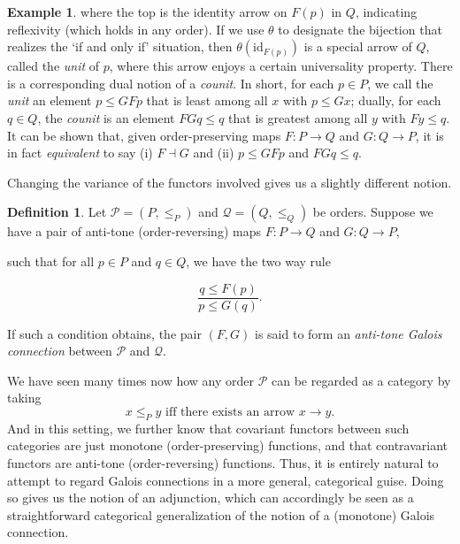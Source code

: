 \documentclass[a4paper]{book}
\theoremstyle{definition}
\newtheorem{example}{Example}[section]
\theoremstyle{definition}
\newtheorem{definition}{Definition}[section]
\theoremstyle{definition}
\theoremstyle{theorem}
\theoremstyle{definition}
\begin{document}
\begin{example}
where the top is the identity arrow on $F(p)$ in $Q$, indicating reflexivity (which holds in any order). If we use $\theta$ to designate the bijection that realizes the `if and only if' situation, then $\theta(\text{id}_{F(p)})$ is a special arrow of $Q$, called the \textit{unit}  of $p$, where this arrow enjoys a certain universality property. There is a corresponding dual notion of a \textit{counit}. In short, for each $p \in P$, we call the \textit{unit} an element $p \leq GFp$ that is least among all $x$ with $p \leq Gx$; dually, for each $q \in Q$, the \textit{counit} is an element $FGq \leq q$ that is greatest among all $y$ with $Fy \leq q$. It can be shown that, given order-preserving maps $F: P \rightarrow Q$ and $G: Q \rightarrow P$, it is in fact \textit{equivalent} to say (i) $F \dashv G$ and (ii) $p \leq GFp$ and $FGq \leq q$.  
\par 
Changing the variance of the functors involved gives us a slightly different notion. 
\begin{definition}
	 Let $\mathcal{P} = (P, \leq_P)$ and $\mathcal{Q} = (Q, \leq_Q)$ be orders. Suppose we have a pair of anti-tone (order-reversing)  maps $F: P \rightarrow Q$ and $G: Q \rightarrow P$, 
	 \begin{center}  
	 \end{center} 
	 such that for all $p \in P$ and $q \in Q$, we have the two way rule 
	 \begin{center} 
	 	\begin{equation*}
	 	\frac{q \leq F(p)}{p \leq G(q)} . 
	 	\end{equation*}
	 \end{center}  
 If such a condition obtains, the pair $(F, G)$ is said to form an \textit{anti-tone Galois connection} between $\mathcal{P}$ and $\mathcal{Q}$. 
\end{definition}
We have seen many times now how any order $\mathcal{P}$ can be regarded as a category by taking
\begin{equation*}
x \leq_P y \text{ iff there exists an arrow } x \rightarrow y.
\end{equation*}
And in this setting, we further know that covariant functors between such categories are just monotone (order-preserving) functions, and that contravariant functors are anti-tone (order-reversing) functions. Thus, it is entirely natural to attempt to regard Galois connections in a more general, categorical guise. Doing so gives us the notion of an adjunction, which can accordingly be seen as a straightforward categorical generalization of the notion of a (monotone) Galois connection. 

\end{example}
\end{document}
